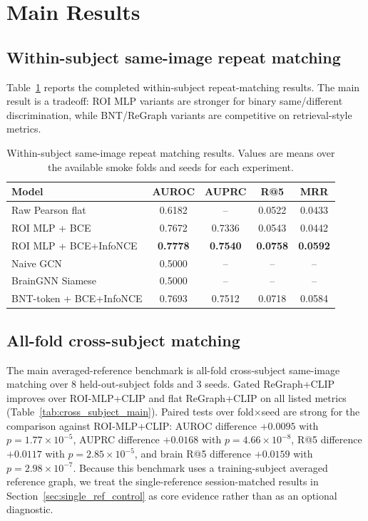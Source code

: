 \documentclass{article}
\begin{document}
\section{Main Results}

\subsection{Within-subject same-image repeat matching}

Table~\ref{tab:within_subject} reports the completed within-subject repeat-matching results. The main result is a tradeoff: ROI MLP variants are stronger for binary same/different discrimination, while BNT/ReGraph variants are competitive on retrieval-style metrics.

\begin{table}[!htbp]
  \centering
  \caption{Within-subject same-image repeat matching results. Values are means over the available smoke folds and seeds for each experiment.}
  \label{tab:within_subject}
  \small
  \begin{tabular}{lcccc}
    \toprule
    Model & AUROC & AUPRC & R@5 & MRR \\
    \midrule
    Raw Pearson flat & 0.6182 & -- & 0.0522 & 0.0433 \\
    ROI MLP + BCE & 0.7672 & 0.7336 & 0.0543 & 0.0442 \\
    ROI MLP + BCE+InfoNCE & \textbf{0.7778} & \textbf{0.7540} & \textbf{0.0758} & \textbf{0.0592} \\
    Naive GCN & 0.5000 & -- & -- & -- \\
    BrainGNN Siamese & 0.5000 & -- & -- & -- \\
    BNT-token + BCE+InfoNCE & 0.7693 & 0.7512 & 0.0718 & 0.0584 \\
    \bottomrule
  \end{tabular}
\end{table}

\subsection{All-fold cross-subject matching}

The main averaged-reference benchmark is all-fold cross-subject same-image matching over 8 held-out-subject folds and 3 seeds. Gated ReGraph+CLIP improves over ROI-MLP+CLIP and flat ReGraph+CLIP on all listed metrics (Table~\ref{tab:cross_subject_main}). Paired tests over fold$\times$seed are strong for the comparison against ROI-MLP+CLIP: AUROC difference $+0.0095$ with $p=1.77\times10^{-5}$, AUPRC difference $+0.0168$ with $p=4.66\times10^{-8}$, R@5 difference $+0.0117$ with $p=2.85\times10^{-5}$, and brain R@5 difference $+0.0159$ with $p=2.98\times10^{-7}$. Because this benchmark uses a training-subject averaged reference graph, we treat the single-reference session-matched results in Section~\ref{sec:single_ref_control} as core evidence rather than as an optional diagnostic.
\end{document}

